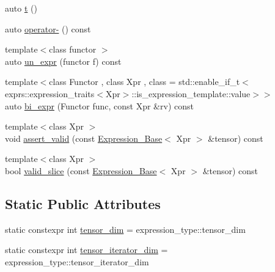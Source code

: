 \begin{DoxyCompactItemize}
\item 
auto \hyperlink{classbc_1_1tensors_1_1Expression__Base_a7a4f07ae4a8afb306705c5a1663ffc91}{t} ()
\item 
auto \hyperlink{classbc_1_1tensors_1_1Expression__Base_afde819cdc43552c581d600dbe07eaa89}{operator-\/} () const
\item 
{\footnotesize template$<$class functor $>$ }\\auto \hyperlink{classbc_1_1tensors_1_1Expression__Base_aa4f92403ae1d1586280abb0b19da73db}{un\+\_\+expr} (functor f) const
\item 
{\footnotesize template$<$class Functor , class Xpr , class  = std\+::enable\+\_\+if\+\_\+t$<$			exprs\+::expression\+\_\+traits$<$\+Xpr$>$\+::is\+\_\+expression\+\_\+template\+::value$>$$>$ }\\auto \hyperlink{classbc_1_1tensors_1_1Expression__Base_a0e70418adb3e28d3f7ec5e8059d0fdbe}{bi\+\_\+expr} (Functor func, const Xpr \&rv) const
\item 
{\footnotesize template$<$class Xpr $>$ }\\void \hyperlink{classbc_1_1tensors_1_1Expression__Base_a317eb91c2bfb04b05cae4c9b37243068}{assert\+\_\+valid} (const \hyperlink{classbc_1_1tensors_1_1Expression__Base}{Expression\+\_\+\+Base}$<$ Xpr $>$ \&tensor) const
\item 
{\footnotesize template$<$class Xpr $>$ }\\bool \hyperlink{classbc_1_1tensors_1_1Expression__Base_a08bd44d9139a11ecab3935267b6557ec}{valid\+\_\+slice} (const \hyperlink{classbc_1_1tensors_1_1Expression__Base}{Expression\+\_\+\+Base}$<$ Xpr $>$ \&tensor) const
\end{DoxyCompactItemize}
\subsection*{Static Public Attributes}
\begin{DoxyCompactItemize}
\item 
static constexpr int \hyperlink{classbc_1_1tensors_1_1Expression__Base_a0789f86dc205c51a86b687600167ec9b}{tensor\+\_\+dim} = expression\+\_\+type\+::tensor\+\_\+dim
\item 
static constexpr int \hyperlink{classbc_1_1tensors_1_1Expression__Base_af5d26cd5600617a002cec1aa9fc4ad05}{tensor\+\_\+iterator\+\_\+dim} = expression\+\_\+type\+::tensor\+\_\+iterator\+\_\+dim
\end{DoxyCompactItemize}
